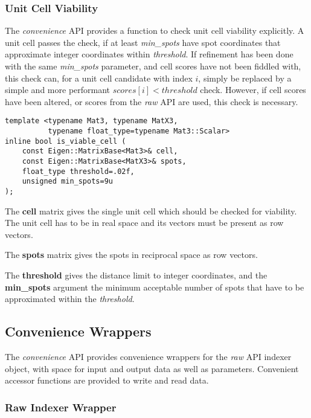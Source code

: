 \documentclass[a4paper,10pt]{article}
\begin{document}
\subsubsection{Unit Cell Viability}

The \emph{convenience} API provides a function to check unit cell viability explicitly. A unit cell passes the check, if at least \emph{min\_spots} have spot coordinates that approximate integer coordinates within \emph{threshold}. If refinement has been done with the same \emph{min\_spots} parameter, and cell scores have not been fiddled with, this check can, for a unit cell candidate with index $i$, simply be replaced by a simple and more performant $scores[i] < threshold$ check. However, if cell scores have been altered, or scores from the \emph{raw} API are used, this check is necessary.

\begin{lstlisting}
template <typename Mat3, typename MatX3,
          typename float_type=typename Mat3::Scalar>
inline bool is_viable_cell (
    const Eigen::MatrixBase<Mat3>& cell,
    const Eigen::MatrixBase<MatX3>& spots,
    float_type threshold=.02f,
    unsigned min_spots=9u
);
\end{lstlisting}

The \textbf{cell} matrix gives the single unit cell which should be checked for viability. The unit cell has to be in real space and its vectors must be present as row vectors.

The \textbf{spots} matrix gives the spots in reciprocal space as row vectors.

The \textbf{threshold} gives the distance limit to integer coordinates, and the \textbf{min\_spots} argument the minimum acceptable number of spots that have to be approximated within the \emph{threshold}.

\subsection{Convenience Wrappers}

The \emph{convenience} API provides convenience wrappers for the \emph{raw} API indexer object, with space for input and output data as well as parameters. Convenient accessor functions are provided to write and read data.

\subsubsection{Raw Indexer Wrapper}
\end{document}
